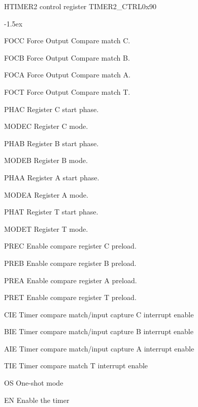 \documentclass[12pt]{article}
\begin{document}
\begin{register}{H}{TIMER2 control register TIMER2\_CTRL}{0x90}
\label{timer2ctrl}
%
%
%
%
%
%
%
%
%
%
%
%
%
%
%
%
%
%
%
%
%
%
\regnewline%
\end{register}
\begin{regdesc}[0.8\textwidth]\begin{reglist}[000000]
\itemsep-1.5ex
\item [FOCC] Force Output Compare match C.
\item [FOCB] Force Output Compare match B.
\item [FOCA] Force Output Compare match A.
\item [FOCT] Force Output Compare match T.
\item [PHAC] Register C start phase.
\item[MODEC] Register C mode.
\item [PHAB] Register B start phase.
\item[MODEB] Register B mode.
\item [PHAA] Register A start phase.
\item[MODEA] Register A mode.
\item[PHAT] Register T start phase.
\item[MODET] Register T mode.
\item[PREC] Enable compare register C preload.
\item[PREB] Enable compare register B preload.
\item[PREA] Enable compare register A preload.
\item[PRET] Enable compare register T preload.
\item[CIE] Timer compare match/input capture C interrupt enable
\item[BIE] Timer compare match/input capture B interrupt enable
\item[AIE] Timer compare match/input capture A interrupt enable
\item[TIE] Timer compare match T interrupt enable
\item[OS] One-shot mode
\item[EN] Enable the timer
\end{reglist}\end{regdesc}
\end{document}
